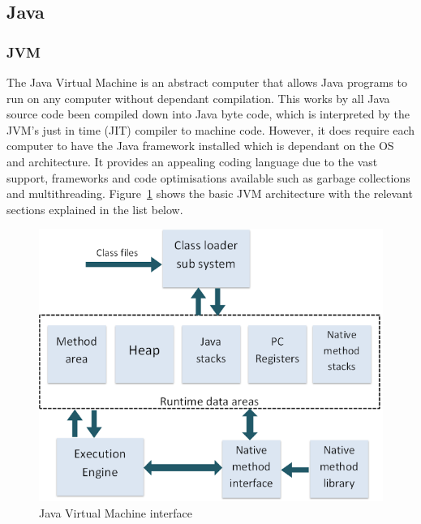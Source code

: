 \documentclass[final_report.tex]{subfiles}
\begin{document}

\subsection{Java}

\subsubsection{JVM}
\label{subsec:jvm}

The Java Virtual Machine is an abstract computer that allows Java programs to run on any computer without dependant compilation. This works by all Java source code been compiled down into Java byte code, which is interpreted by the JVM's just in time (JIT) compiler to machine code. However, it does require each computer to have the Java framework installed which is dependant on the OS and architecture. It provides an appealing coding language due to the vast support, frameworks and code optimisations available such as garbage collections and multithreading. Figure~\ref{fig:jvm} shows the basic JVM architecture with the relevant sections explained in the list below.

\begin{figure}[H]
	\centering
	\includegraphics[width=\textwidth]{img/jvm.png}
	\caption{Java Virtual Machine interface \cite{jvm}}
	\label{fig:jvm}
\end{figure}
\end{document}

